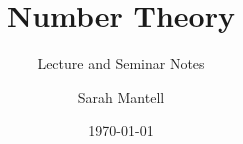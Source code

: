 \documentclass[letterpaper,
                fontsize=10pt]{kaobook}
\begin{document}
    \title[Number Theory]{Number Theory}
    \subtitle{Lecture and Seminar Notes}

    \author[Sarah Mantell]{Sarah Mantell}

    \date{\today}

    \frontmatter
    \maketitle


    \mainmatter

    
\end{document}
